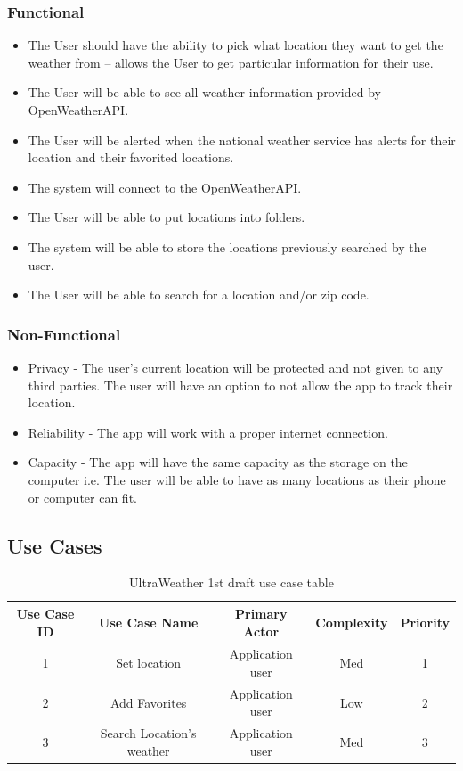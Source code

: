 \documentclass[10pt,conference,onecolumn,compsoc]{IEEEtran}
\begin{document}
\subsubsection{Functional}
\begin{itemize}
\item The User should have the ability to pick what location they want to get the weather from -- allows the User to get particular information for their use.
\item The User will be able to see all weather information provided by OpenWeatherAPI.
\item The User will be alerted when the national weather service has alerts for their location and their favorited locations.
\item The system will connect to the OpenWeatherAPI.
\item The User will be able to put locations into folders.
\item The system will be able to store the locations previously searched by the user.
\item The User will be able to search for a location and/or zip code.
\end{itemize}

\subsubsection{Non-Functional}
\begin{itemize}
\item Privacy - The user's current location will be protected and not given to any third parties. The user will have an option to not allow the app to track their location.
\item Reliability - The app will work with a proper internet connection.
\item Capacity - The app will have the same capacity as the storage on the computer i.e. The user will be able to have as many locations as their phone or computer can fit.
\end{itemize}

\subsection{Use Cases}


\begin{table}
\centering
\begin{tabular}{|c|c|c|c|c|}
\hline
Use Case ID & Use Case Name & Primary Actor & Complexity & Priority \\
\hline \hline
1 & Set location & Application user & Med & 1\\
\hline
2 & Add Favorites & Application user & Low & 2\\
\hline
3 & Search Location's weather & Application user & Med & 3\\
\hline

\end{tabular}
\caption{UltraWeather 1st draft use case table}
\label{tab:useCaseIndex}
\end{table}
\end{document}
